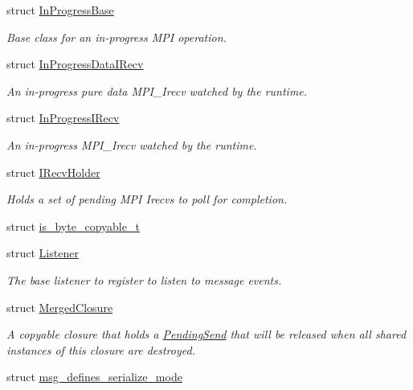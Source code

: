 \begin{DoxyCompactItemize}
\item 
struct \hyperlink{structvt_1_1messaging_1_1_in_progress_base}{In\+Progress\+Base}
\begin{DoxyCompactList}\small\item\em Base class for an in-\/progress M\+PI operation. \end{DoxyCompactList}\item 
struct \hyperlink{structvt_1_1messaging_1_1_in_progress_data_i_recv}{In\+Progress\+Data\+I\+Recv}
\begin{DoxyCompactList}\small\item\em An in-\/progress pure data M\+P\+I\+\_\+\+Irecv watched by the runtime. \end{DoxyCompactList}\item 
struct \hyperlink{structvt_1_1messaging_1_1_in_progress_i_recv}{In\+Progress\+I\+Recv}
\begin{DoxyCompactList}\small\item\em An in-\/progress M\+P\+I\+\_\+\+Irecv watched by the runtime. \end{DoxyCompactList}\item 
struct \hyperlink{structvt_1_1messaging_1_1_i_recv_holder}{I\+Recv\+Holder}
\begin{DoxyCompactList}\small\item\em Holds a set of pending M\+PI Irecvs to poll for completion. \end{DoxyCompactList}\item 
struct \hyperlink{structvt_1_1messaging_1_1is__byte__copyable__t}{is\+\_\+byte\+\_\+copyable\+\_\+t}
\item 
struct \hyperlink{structvt_1_1messaging_1_1_listener}{Listener}
\begin{DoxyCompactList}\small\item\em The base listener to register to listen to message events. \end{DoxyCompactList}\item 
struct \hyperlink{structvt_1_1messaging_1_1_merged_closure}{Merged\+Closure}
\begin{DoxyCompactList}\small\item\em A copyable closure that holds a {\ttfamily \hyperlink{structvt_1_1messaging_1_1_pending_send}{Pending\+Send}} that will be released when all shared instances of this closure are destroyed. \end{DoxyCompactList}\item 
struct \hyperlink{structvt_1_1messaging_1_1msg__defines__serialize__mode}{msg\+\_\+defines\+\_\+serialize\+\_\+mode}

\end{DoxyCompactItemize}
